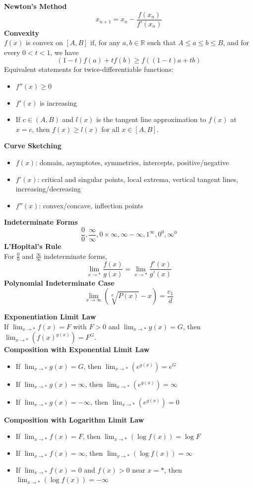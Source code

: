 \documentclass[10pt]{article}
\newcommand{\R}{{\mathbb R}}
\begin{document}
\begin{multicols}{3}
\begin{itemize}
\end{itemize}
\textbf{Newton's Method}
\[x_{n+1}=x_n-\frac{f(x_n)}{f'(x_n)}\]
\textbf{Convexity} \\
$f(x)$ is convex on $[A,B]$ if, for any $a,b\in\R$ such that $A\le a \le b \le B$, and for every $0<t<1$, we have 
\[(1-t)f(a)+tf(b)\ge f((1-t)a+tb)\]
Equivalent statements for twice-differentiable functions:
\begin{itemize}
    \item $f''(x) \ge 0$ 
    \item $f'(x)$ is increasing
    \item If $c\in (A,B)$ and $l(x)$ is the tangent line approximation to $f(x)$ at $x=c$, then $f(x)\ge l(x)$ for all $x\in [A,B]$. 
\end{itemize}
\textbf{Curve Sketching} 
\begin{itemize}
    \item $f(x)$: domain, asymptotes, symmetries, intercepts, positive/negative
    \item $f'(x)$: critical and singular points, local extrema, vertical tangent lines, increasing/decreasing
    \item $f''(x)$: convex/concave, inflection points
\end{itemize}
\textbf{Indeterminate Forms}
\[\frac{0}{0}, \frac{\infty}{\infty},  0\times\infty, \infty-\infty, 1^\infty, 0^0, \infty^0\]
\textbf{L'Hopital's Rule} \\
For $\frac{0}{0}$ and $\frac{\infty}{\infty}$ indeterminate forms,
\[\lim_{x\to *}\frac{f(x)}{g(x)}=\lim_{x\to *}\frac{f'(x)}{g'(x)}\]
\textbf{Polynomial Indeterminate Case}
\[\lim_{x\to\infty}(\sqrt[d]{P(x)}-x)=\frac{c_1}{d}\]
\end{multicols}

\newpage
\begin{multicols}{2}
\textbf{Exponentiation Limit Law} \\
If $\lim_{x\to *}f(x)=F$ with $F>0$ and $\lim_{x\to *}g(x)=G$, then $\lim_{x\to *}(f(x)^{g(x)})=F^G$. \\
\textbf{Composition with Exponential Limit Law} 
\begin{itemize}
    \item If $\lim_{x\to *}g(x)=G$, then $\lim_{x\to *}(e^{g(x)})=e^G$
    \item If $\lim_{x\to *}g(x)=\infty$, then $\lim_{x\to *}(e^{g(x)})=\infty$
    \item If $\lim_{x\to *}g(x)=-\infty$, then $\lim_{x\to *}(e^{g(x)})=0$
\end{itemize}
\textbf{Composition with Logarithm Limit Law}
\begin{itemize}
    \item If $\lim_{x\to *}f(x)=F$, then $\lim_{x\to *}(\log f(x))=\log F$
    \item If $\lim_{x\to *}f(x)=\infty$, then $\lim_{x\to *}(\log f(x))=\infty$
    \item If $\lim_{x\to *}f(x)=0$ and $f(x)>0$ near $x=*$, then $\lim_{x\to *}(\log f(x))=-\infty$
\end{itemize}
\end{multicols}
\end{document}
